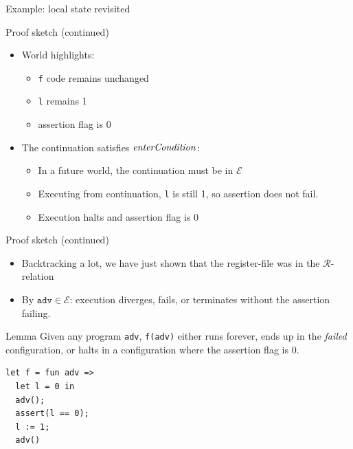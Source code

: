 \documentclass{beamer}
\newcommand{\failed}{\textsl{failed}}
\newcommand{\plainfun}[2]{
  \ifthenelse{\equal{#2}{}}
             {\mathit{#1}}
             {\mathit{#1}(#2)}
}
\newcommand{\entryCond}[1]{\plainfun{enterCondition}{#1}}
\newcommand{\asmType}{\plaindom{AsmType}}
\newcommand{\plaindom}[1]{\mathrm{#1}}
\newcommand{\intr}[2]{\mathcal{#1}}
\newcommand{\exprintr}[1]{\intr{E}{#1}}
\newcommand{\regintr}[1]{\intr{R}{#1}}
\newcommand{\stder}{\exprintr{\asmType}}
\newcommand{\stdrr}{\regintr{\asmType}}
\begin{document}
\begin{frame}{Example: local state revisited}
\begin{overprint}
Proof sketch (continued)
\begin{itemize}
\item<16-> World highlights:
  \begin{itemize}
  \item \texttt{f} code remains unchanged
  \item \texttt{l} remains 1
  \item assertion flag is 0
  \end{itemize}
\item<16-> The continuation satisfies $\entryCond{}$:
  \begin{itemize}
  \item<17-> In a future world, the continuation must be in $\stder$
  \item<18-> Executing from continuation, \texttt{l} is still 1, so assertion does not fail.
  \item<19-> Execution halts and assertion flag is 0
  \end{itemize}

\end{itemize}
Proof sketch (continued)
\begin{itemize}
\item<20-> Backtracking a lot, we have just shown that the register-file was in the $\stdrr$-relation
\item<21-> By $\mathtt{adv} \in \stder$: execution diverges, fails, or terminates without the assertion failing.
\end{itemize}

\begin{block}{Lemma}
  Given any program \texttt{adv}, \texttt{f(adv)} either runs forever, ends up in the \failed{} configuration, or halts in a configuration where the assertion flag is 0.
\end{block}
\begin{overlayarea}{\textwidth}{0.5cm}
  
\end{overlayarea}

\end{overprint}
\begin{overlayarea}{\textwidth}{3cm}
  \usebox{\locstatebox}
\end{overlayarea}
\end{frame}


\begin{lrbox}{\continuationbox}
  \begin{lstlisting}
let f = fun adv =>
  let l = 0 in
  adv();
  assert(l == 0);
  l := 1;
  adv()
  \end{lstlisting}
\end{lrbox}
\end{document}
